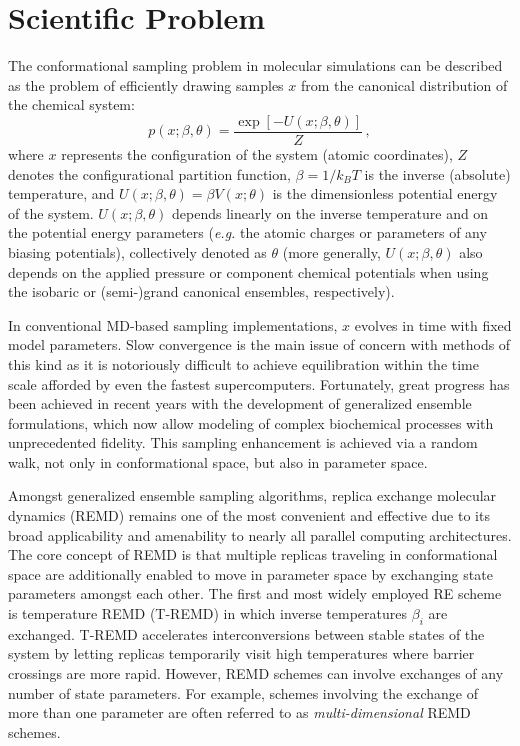 \documentclass{sig-alternate}
\begin{document}
\section{Scientific Problem}\label{sec:requirements}

The conformational sampling problem in molecular simulations can be described 
as the problem of efficiently drawing samples $x$ from the canonical 
distribution of the chemical system:
\begin{equation}
p(x;\beta,\theta) = \frac{\exp[-U(x;\beta,\theta)]}{Z} \, ,
\end{equation}
where $x$ represents the configuration of the system (atomic coordinates), $Z$ 
denotes the configurational partition function, $\beta=1/k_B T$ is the inverse 
(absolute) temperature, and $U(x;\beta,\theta)=\beta V(x;\theta)$ is the 
dimensionless potential energy of the system.  $U(x;\beta,\theta)$ depends 
linearly on the inverse temperature and on the potential energy parameters 
({\em e.g.} the atomic charges or parameters of any biasing potentials), 
collectively denoted as $\theta$ (more generally, $U(x;\beta,\theta)$ also 
depends on the applied pressure or component chemical potentials when using 
the isobaric or (semi-)grand canonical ensembles, respectively).

In conventional MD-based sampling implementations, $x$ evolves in time with 
fixed model parameters. Slow convergence is the main issue of concern with 
methods of this kind as it is notoriously difficult to achieve equilibration 
within the time scale afforded by even the fastest supercomputers. Fortunately,
great progress has been achieved in recent years with the development of 
generalized ensemble formulations, which now allow modeling of complex 
biochemical processes with unprecedented fidelity. This sampling enhancement is
achieved via a random walk, not only in conformational space, but also in 
parameter space.

Amongst generalized ensemble sampling algorithms, replica exchange molecular
dynamics (REMD) remains one of the most convenient and effective due to its 
broad applicability and amenability to nearly all parallel computing 
architectures. The core concept of REMD is that multiple replicas traveling in
conformational space are additionally enabled to move in parameter space by 
exchanging state parameters amongst each other. The first and most widely 
employed RE scheme is temperature REMD (T-REMD) in which inverse temperatures 
$\beta_i$ are exchanged. T-REMD accelerates interconversions between stable 
states of the system by letting replicas temporarily visit high temperatures 
where barrier crossings are more rapid. However, REMD schemes can involve 
exchanges of any number of state parameters. For example, schemes involving the
exchange of more than one parameter are often referred to as 
\emph{multi-dimensional} REMD schemes.\cite{Mitsutake2010}
\end{document}
